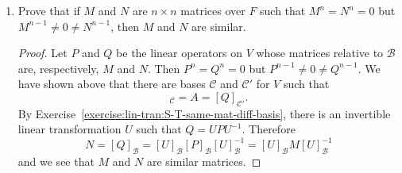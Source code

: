 \begin{enumerate}
\begin{proof}
    Now suppose $c_1,c_2,\dots,c_n$ are scalars in $F$ such that
    \begin{equation*}
      c_1\beta_1 + c_2\beta_2 + \cdots + c_n\beta_n = 0.
    \end{equation*}
    Taking $S^{n-1}$ of both sides gives $c_1\beta_n = 0$, which
    implies that $c_1 = 0$. So
    \begin{equation*}
      c_2\beta_2 + c_3\beta_3 + \cdots + c_n\beta_n = 0,
    \end{equation*}
    and we can take $S^{n-2}$ of both sides to get $c_2\beta_n = 0$,
    implying that $c_2$ is zero. More generally, assuming that
    $c_1,\dots,c_k$ are all zero for some $k$ with $1\leq k\leq n-1$,
    we have
    \begin{equation*}
      c_{k+1}\beta_{k+1} + \cdots + c_n\beta_n = 0.
    \end{equation*}
    Taking $S^{n-k-1}$ of both sides (in the case where $k = n-1$, we
    take $S^0 = I$) then gives $c_{k+1}\beta_n = 0$, so that
    $c_{k+1} = 0$. Therefore $c_1 = c_2 = \cdots = c_n = 0$ and
    $\mathcal{B}'$ is linearly independent. Since $\dim V = n$ and
    $\mathcal{B}'$ is a linearly independent set of $n$ vectors in
    $V$, it follows that $\mathcal{B}'$ is a basis for $V$.

    Finally, we have defined $\beta_1,\dots,\beta_n$ so that
    \begin{equation*}
      S\beta_j = \beta_{j+1}, \quad
      j = 1, \dots, n - 1, \quad
      S\beta_n = 0.
    \end{equation*}
    Therefore we have $[S]_{\mathcal{B}'} = A$.
  \end{proof}

\item Prove that if $M$ and $N$ are $n\times n$ matrices over $F$ such
  that $M^n = N^n = 0$ but $M^{n-1}\neq 0\neq N^{n-1}$, then $M$ and
  $N$ are similar.
  \begin{proof}
    Let $P$ and $Q$ be the linear operators on $V$ whose matrices
    relative to $\mathcal{B}$ are, respectively, $M$ and $N$. Then
    $P^n = Q^n = 0$ but $P^{n-1}\neq0\neq Q^{n-1}$. We have shown
    above that there are bases $\mathcal{C}$ and $\mathcal{C}'$ for
    $V$ such that
    \begin{equation*}
      [P]_{\mathcal{C}} = A = [Q]_{\mathcal{C}'}.
    \end{equation*}
    By Exercise~\ref{exercise:lin-tran:S-T-same-mat-diff-basis}, there
    is an invertible linear transformation $U$ such that
    $Q = UPU^{-1}$. Therefore
    \begin{equation*}
      N = [Q]_{\mathcal{B}}
      = [U]_{\mathcal{B}}[P]_{\mathcal{B}}[U]_{\mathcal{B}}^{-1}
      = [U]_{\mathcal{B}}M[U]_{\mathcal{B}}^{-1}
    \end{equation*}
    and we see that $M$ and $N$ are similar matrices.
  \end{proof}
\end{enumerate}

